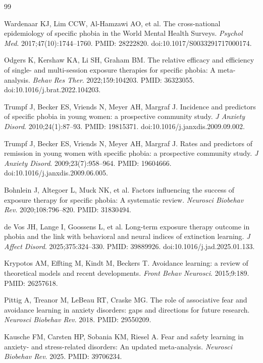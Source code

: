\documentclass[9pt,twocolumn]{article}
\begin{document}
\begin{thebibliography}{99}
\small

Wardenaar KJ, Lim CCW, Al-Hamzawi AO, et al. The cross-national epidemiology of specific phobia in the World Mental Health Surveys. \emph{Psychol Med}. 2017;47(10):1744--1760. PMID: 28222820. doi:10.1017/S0033291717000174.

Odgers K, Kershaw KA, Li SH, Graham BM. The relative efficacy and efficiency of single- and multi-session exposure therapies for specific phobia: A meta-analysis. \emph{Behav Res Ther}. 2022;159:104203. PMID: 36323055. doi:10.1016/j.brat.2022.104203.

Trumpf J, Becker ES, Vriends N, Meyer AH, Margraf J. Incidence and predictors of specific phobia in young women: a prospective community study. \emph{J Anxiety Disord}. 2010;24(1):87--93. PMID: 19815371. doi:10.1016/j.janxdis.2009.09.002.

Trumpf J, Becker ES, Vriends N, Meyer AH, Margraf J. Rates and predictors of remission in young women with specific phobia: a prospective community study. \emph{J Anxiety Disord}. 2009;23(7):958--964. PMID: 19604666. doi:10.1016/j.janxdis.2009.06.005.

Bohnlein J, Altegoer L, Muck NK, et al. Factors influencing the success of exposure therapy for specific phobia: A systematic review. \emph{Neurosci Biobehav Rev}. 2020;108:796--820. PMID: 31830494.

de Vos JH, Lange I, Goossens L, et al. Long-term exposure therapy outcome in phobia and the link with behavioral and neural indices of extinction learning. \emph{J Affect Disord}. 2025;375:324--330. PMID: 39889926. doi:10.1016/j.jad.2025.01.133.

Krypotos AM, Effting M, Kindt M, Beckers T. Avoidance learning: a review of theoretical models and recent developments. \emph{Front Behav Neurosci}. 2015;9:189. PMID: 26257618.

Pittig A, Treanor M, LeBeau RT, Craske MG. The role of associative fear and avoidance learning in anxiety disorders: gaps and directions for future research. \emph{Neurosci Biobehav Rev}. 2018. PMID: 29550209.

Kausche FM, Carsten HP, Sobania KM, Riesel A. Fear and safety learning in anxiety- and stress-related disorders: An updated meta-analysis. \emph{Neurosci Biobehav Rev}. 2025. PMID: 39706234.


\end{thebibliography}
\end{document}
